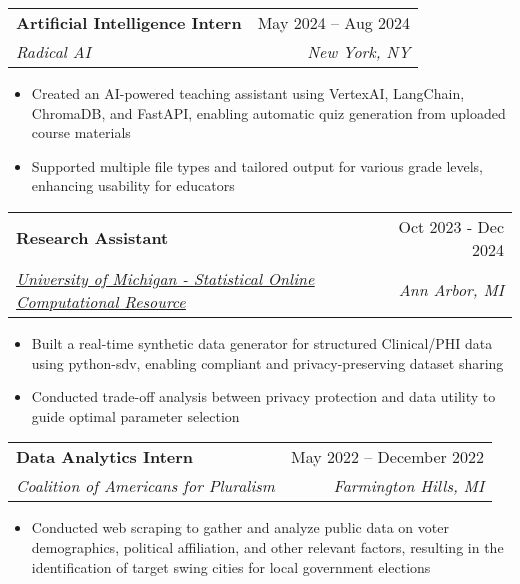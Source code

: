 \documentclass[letterpaper,11pt]{article}
\makeatletter
\newcommand{\resumeItem}[1]{
  \item\small{
    {#1 \vspace{-2pt}}
  }
}
\newcommand{\resumeSubheading}[4]{
  \vspace{-2pt}\item
    \begin{tabular*}{0.97\textwidth}[t]{l@{\extracolsep{\fill}}r}
      \textbf{#1} & #2 \\
      \textit{\small#3} & \textit{\small #4} \\
    \end{tabular*}\vspace{-7pt}
}
\newcommand{\resumeItemListStart}{\begin{itemize}}
\newcommand{\resumeItemListEnd}{\end{itemize}\vspace{-5pt}}
\makeatother
\begin{document}
    \resumeSubheading
    {Artificial Intelligence Intern}{May 2024 -- Aug 2024}
    {Radical AI}{New York, NY}
    \resumeItemListStart
        \resumeItem{Created an AI-powered teaching assistant using VertexAI, LangChain, ChromaDB, and FastAPI, enabling automatic quiz generation from uploaded course materials}
        \resumeItem{Supported multiple file types and tailored output for various grade levels, enhancing usability for educators}
    \resumeItemListEnd



      \resumeSubheading
      {Research Assistant}{Oct 2023 - Dec 2024}
{{\underline{\href{http://www.socr.umich.edu/}{University of Michigan - Statistical Online Computational Resource}}}}
      {Ann Arbor, MI}
      \resumeItemListStart
        \resumeItem{Built a real-time synthetic data generator for structured Clinical/PHI data using python-sdv, enabling compliant and privacy-preserving dataset sharing}
        \resumeItem{Conducted trade-off analysis between privacy protection and data utility to guide optimal parameter selection}
      \resumeItemListEnd



    \resumeSubheading
      {Data Analytics Intern}{May 2022 -- December 2022}
      {Coalition of Americans for Pluralism}{Farmington Hills, MI}
      \resumeItemListStart
        \resumeItem{Conducted web scraping to gather and analyze public data on voter demographics, political affiliation, and other relevant factors, resulting in the identification of target swing cities for local government elections}
      \resumeItemListEnd
\end{document}
